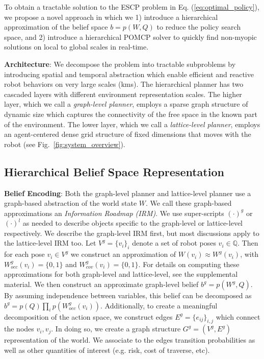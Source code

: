 \documentclass[letterpaper]{article} %
\newcommand{\ph}[1]{{\textbf{#1}:}} %
\begin{document}
To obtain a tractable solution to the ESCP problem in Eq. (\ref{eq:optimal_policy}), we propose a novel approach in which we 1) introduce a hierarchical approximation of the belief space $b=p(W,Q)$ to reduce the policy search space, and 2) introduce a hierarchical POMCP solver to quickly find non-myopic solutions on local to global scales in real-time.

\ph{Architecture}  We decompose the problem into tractable subproblems by introducing spatial and temporal abstraction which enable efficient and reactive robot behaviors on very large scales (kms).  The hierarchical planner has two cascaded layers with different environment representation scales. The higher layer, which we call a \emph{graph-level planner}, employs a sparse graph structure of dynamic size which captures the connectivity of the free space in the known part of the environment. The lower layer, which we call a \emph{lattice-level planner}, employs an agent-centered dense grid structure of fixed dimensions that moves with the robot (see Fig.~\ref{fig:system_overview}). %

\subsection{Hierarchical Belief Space Representation} 

\ph{Belief Encoding} Both the graph-level planner and lattice-level planner use a graph-based abstraction of the world state $W$.  We call these graph-based approximations an \textit{Information Roadmap (IRM)}. %
We use super-scripts $(\cdot)^g$ or $(\cdot)^l$ as needed to describe objects specific to the graph-level or lattice-level respectively. We describe the graph-level IRM first, but most discussions apply to the lattice-level IRM too. Let $V^g=\{v_i\}_i$ denote a set of robot poses $v_i\in \mathbb{Q}$.  Then for each pose $v_i\in V^g$ we construct an approximation of $W(v_i) \approx W^g(v_i)$, with $W_{occ}^g(v_i) = \{0,1\}$ and $W_{cov}^g(v_i) = \{0,1\}$.  %
For details on computing these approximations for both graph-level and lattice-level, see the supplemental material.  We then construct an approximate graph-level belief $b^g=p(W^g, Q)$.  By assuming independence between variables, this belief can be decomposed as $b^g=p(Q)\prod_i p(W_{occ}^g(v_i))$.  Additionally, to create a meaningful decomposition of the action space, we construct edges $E^g=\{e_{ij}\}_{i,j}$ which connect the nodes $v_i, v_j$.  In doing so, we create a graph structure $G^g=(V^g, E^g)$ representation of the world.  We associate to the edges transition probabilities as well as other quantities of interest (e.g. risk, cost of traverse, etc).
\end{document}
